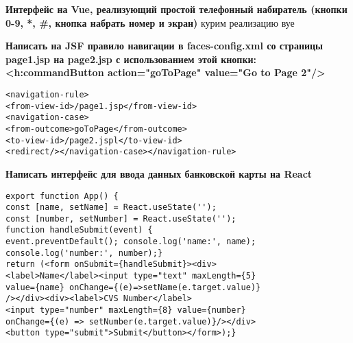 \documentclass{article}
\begin{document}
\begin{minipage}[t]{0.3\textwidth}
    \textbf{Интерфейс на Vue, реализующий простой телефонный набиратель (кнопки 0-9, *, \#, кнопка набрать номер и экран)}
курим реализацию вуе
\end{minipage}%
\hfill
\begin{minipage}[t]{0.3\textwidth}
    \textbf{Написать на JSF правило навигации в faces-config.xml со страницы page1.jsp на page2.jsp с использованием этой кнопки: <h:commandButton action="goToPage" value="Go to Page 2"/>}
    \begin{lstlisting}[frame=single, basicstyle=\tiny\ttfamily, breaklines=true, breakatwhitespace=true, postbreak=\mbox{\textcolor{red}{$\hookrightarrow$}\space}]
<navigation-rule>
<from-view-id>/page1.jsp</from-view-id>
<navigation-case>
<from-outcome>goToPage</from-outcome>
<to-view-id>/page2.jspl</to-view-id>
<redirect/></navigation-case></navigation-rule>
    \end{lstlisting}
\end{minipage}%
\hfill
\begin{minipage}[t]{0.3\textwidth}
    \textbf{Написать интерфейс для ввода данных банковской карты на React}
    \begin{lstlisting}[frame=single, basicstyle=\tiny\ttfamily, breaklines=true, breakatwhitespace=true, postbreak=\mbox{\textcolor{red}{$\hookrightarrow$}\space}]
export function App() {
const [name, setName] = React.useState('');
const [number, setNumber] = React.useState('');
function handleSubmit(event) {
event.preventDefault(); console.log('name:', name);
console.log('number:', number);}
return (<form onSubmit={handleSubmit}><div>
<label>Name</label><input type="text" maxLength={5}
value={name} onChange={(e)=>setName(e.target.value)}
/></div><div><label>CVS Number</label>
<input type="number" maxLength={8} value={number}
onChange={(e) => setNumber(e.target.value)}/></div>
<button type="submit">Submit</button></form>);}
    \end{lstlisting}
\end{minipage}%
\end{document}

